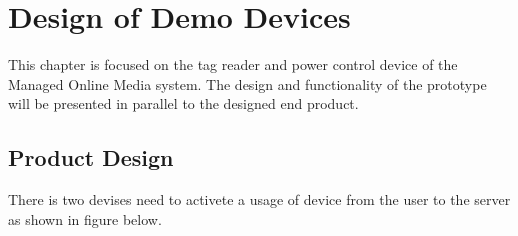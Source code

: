 \chapter{Design of Demo Devices}
This chapter is focused on the tag reader and power control device of the Managed Online Media system. \newline
The design and functionality of the prototype will be presented in parallel to the designed end product. \newline

\section{Product Design}

There is two devises need to activete a usage of device from the user to the server as shown in figure below.

